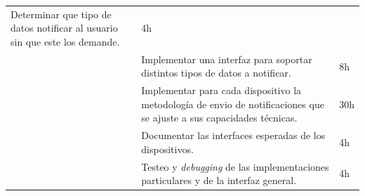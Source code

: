 \begin{longtable}[c]{@{}lll@{}}
\begin{minipage}[t]{0.62\columnwidth}
Determinar que tipo de datos notificar al usuario sin que este los
demande.
\end{minipage} & \begin{minipage}[t]{0.10\columnwidth}\raggedright
4h
\end{minipage}
\\\noalign{\medskip}
\begin{minipage}[t]{0.28\columnwidth}\raggedright
\end{minipage} & \begin{minipage}[t]{0.62\columnwidth}\raggedright
Implementar una interfaz para soportar distintos tipos de datos a
notificar.
\end{minipage} & \begin{minipage}[t]{0.10\columnwidth}\raggedright
8h
\end{minipage}
\\\noalign{\medskip}
\begin{minipage}[t]{0.28\columnwidth}\raggedright
\end{minipage} & \begin{minipage}[t]{0.62\columnwidth}\raggedright
Implementar para cada dispositivo la metodología de envio de
notificaciones que se ajuste a sus capacidades técnicas.
\end{minipage} & \begin{minipage}[t]{0.10\columnwidth}\raggedright
30h
\end{minipage}
\\\noalign{\medskip}
\begin{minipage}[t]{0.28\columnwidth}\raggedright
\end{minipage} & \begin{minipage}[t]{0.62\columnwidth}\raggedright
Documentar las interfaces esperadas de los dispositivos.
\end{minipage} & \begin{minipage}[t]{0.10\columnwidth}\raggedright
4h
\end{minipage}
\\\noalign{\medskip}
\begin{minipage}[t]{0.28\columnwidth}\raggedright
\end{minipage} & \begin{minipage}[t]{0.62\columnwidth}\raggedright
Testeo y \emph{debugging} de las implementaciones particulares y de la
interfaz general.
\end{minipage} & \begin{minipage}[t]{0.10\columnwidth}\raggedright
4h
\end{minipage}

\end{longtable}
